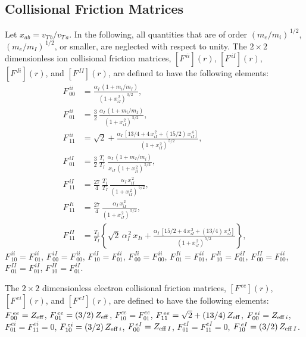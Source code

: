 \documentclass[notitlepage,12pt]{article}
\begin{document}
\subsection{Collisional Friction Matrices}
Let $x_{ab}=v_{T\,b}/v_{T\,a}$. In the following,
all quantities that are of order $(m_e/m_i)^{\,1/2}$, $(m_e/m_I)^{\,1/2}$, or smaller, are neglected with respect to unity.
The  $2\times 2$ dimensionless ion collisional friction matrices, $[F^{\,ii}](r)$, $[F^{\,iI}](r)$, $[F^{\,Ii}](r)$, and $[F^{\,II}](r)$, are defined to have the following elements:
\begin{align}
F^{\,ii}_{\,00} &= \frac{\alpha_I\,(1+m_i/m_I)}{(1+x_{iI}^{\,2})^{\,3/2}},\\[0.5ex]
F^{\,ii}_{\,01}&=\frac{3}{2}\,\frac{\alpha_I\,(1+m_i/m_I)}{(1+x_{iI}^{\,2})^{\,5/2}},\\[0.5ex]
F^{\,ii}_{\,11}& =\sqrt{2}+ \frac{\alpha_I\,[13/4+4\,x_{iI}^{\,2}+(15/2)\,x_{iI}^{\,4}]}{(1+x_{iI}^{\,2})^{\,5/2}},\\[0.5ex]
F^{\,iI}_{\,01}&=\frac{3}{2}\,\frac{T_i}{T_I}\,\frac{\alpha_I\,(1+m_I/m_i)}{x_{iI}\,(1+x_{Ii}^{\,2})^{\,5/2}},\\[0.5ex]
F^{\,iI}_{\,11}& =\frac{27}{4}\,\frac{T_i}{T_I}\,\frac{\alpha_I\,x_{iI}^{\,2}}{(1+x_{iI}^{\,2})^{\,5/2}},\\[0.5ex]
F^{\,Ii}_{\,11}& =\frac{27}{4}\,\frac{\alpha_I\,x_{iI}^{\,2}}{(1+x_{iI}^{\,2})^{\,5/2}},\\[0.5ex]
F^{\,II}_{\,11}& =\frac{T_i}{T_I}\left\{\sqrt{2}\,\alpha_I^{\,2}\,x_{Ii} + \frac{\alpha_I\,[
15/2+4\,x_{iI}^{\,2}+(13/4)\,x_{iI}^{\,4}]}{(1+x_{iI}^{\,2})^{\,5/2}}\right\},
\end{align}
 $F^{\,ii}_{\,10}=F^{\,ii}_{\,01}$, $F^{\,iI}_{\,00} =F^{\,ii}_{\,00}$, $F^{\,iI}_{\,10}=F^{\,ii}_{01}$, $F^{\,Ii}_{\,00} =F^{\,ii}_{\,00}$,
$F^{\,Ii}_{\,01}=F^{\,ii}_{01}$, 
$F^{\,Ii}_{\,10}=F^{\,iI}_{01}$, $F^{\,II}_{\,00} =F^{\,ii}_{00}$,
$F^{\,II}_{\,01}=F^{\,iI}_{01}$, 
$F^{\,II}_{\,10}=F^{\,iI}_{01}$.

The $2\times 2$ dimensionless electron collisional friction matrices, $[F^{\,ee}](r)$,   $[F^{\,ei}](r)$, and
$[F^{\,eI}](r)$, are defined to have the following elements:
$F^{\,ee}_{00} = Z_{\rm eff}$,
$F^{\,ee}_{01} = (3/2)\,Z_{\rm eff}$,
$F^{\,ee}_{10} = F^{\,ee}_{01}$,
$F^{\,ee}_{11}= \sqrt{2} + (13/4)\,Z_{\rm eff}$, $F^{\,ei}_{00} = Z_{{\rm eff}\,i}$,
$F^{\,ei}_{01} =F^{\,ei}_{11}=0$, $F^{\,ei}_{10}=(3/2)\,Z_{{\rm eff}\,i}$,  $F^{\,eI}_{00} = Z_{{\rm eff}\,I}$,
$F^{\,eI}_{01} =F^{\,eI}_{11}=0$, $F^{\,eI}_{10}=(3/2)\,Z_{{\rm eff}\,I}$. 
\end{document}

